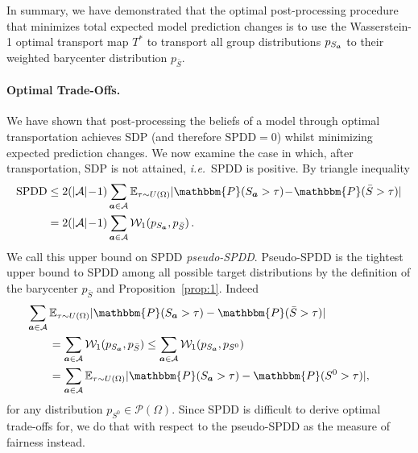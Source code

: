 \documentclass[letterpaper]{article}
\newcommand{\ie}{\emph{i.e.}}
\theoremstyle{definition}
\newcommand{\W}{\mathcal{W}}
\newcommand{\Sa}{S_{\va}}
\newcommand{\bS}{\bar{S}}
\begin{document}
In summary, we have demonstrated that the optimal post-processing procedure that minimizes total expected model prediction changes is to use the Wasserstein-1 optimal transport map $T^*$ to transport all group distributions $p_{\Sa}$ to their weighted barycenter distribution $p_{\bS}$. 

\paragraph{Optimal Trade-Offs.}
We have shown that post-processing the beliefs of a model through optimal transportation achieves SDP (and therefore $\textrm{SPDD}=0$) whilst minimizing expected prediction changes. 
We now examine the case in which, after transportation, SDP is not attained, \ie~SPDD is positive.
By triangle inequality
\begin{align*}
    \text{SPDD} 
    & \leq 2(|\mathcal{A}|\!-\!1) \sum_{\va\in \mathcal{A}} \mathbb{E}_{\tau\sim U(\Omega)} |\mathbbm{P}(S_{\va}>\tau) \!-\! \mathbbm{P}(\bS>\tau)|\\
    & = 2(|\mathcal{A}|\!-\!1) \sum_{\va\in \mathcal{A}} \W_1(p_{\Sa}, p_{\bS})\,.
\end{align*}
 We call this upper bound on SPDD \emph{pseudo-SPDD}. Pseudo-SPDD is the tightest upper bound to SPDD among all possible target distributions by the definition of the barycenter $p_{\bS}$ and Proposition~\ref{prop:1}. Indeed 
\begin{align*}
&\hskip-0.7cm \sum_{\va\in \mathcal{A}} \mathbb{E}_{\tau\sim U(\Omega)} |\mathbbm{P}(S_{\va}>\tau) - \mathbbm{P}(\bar S > \tau)| \\
& = \sum_{\va\in \mathcal{A}} \W_1(p_{\Sa}, p_{\bS}) \leq \sum_{\va\in \mathcal{A}} \W_1(p_{\Sa}, p_{S^0})\\
& = \sum_{\va\in \mathcal{A}} \mathbb{E}_{\tau\sim U(\Omega)} |\mathbbm{P}(S_{\va}>\tau) - \mathbbm{P}(S^0 > \tau)|,
\end{align*}
for any distribution $p_{S^0}\in\mathcal{P}(\Omega)$. Since SPDD is difficult to derive optimal trade-offs for, we do that with respect to the pseudo-SPDD as the measure of fairness instead.
\end{document}
